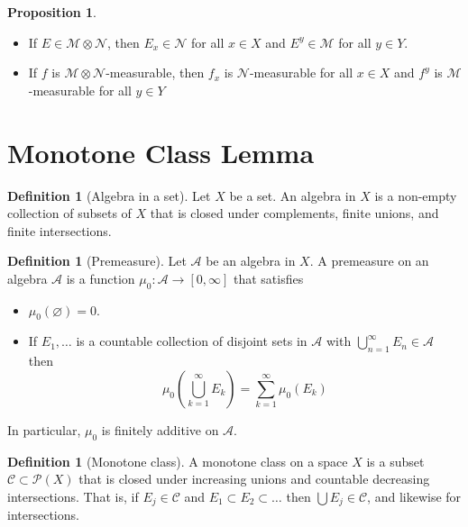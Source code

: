 \documentclass{article}
\theoremstyle{definition}
\newtheorem{prop}{Proposition}[section]
\newcommand{\lp}{\left(}
\newcommand{\rp}{\right)}
\theoremstyle{theorem}
\newtheorem{definition}[theorem]{Definition}
\begin{document}
\begin{prop}
$\,$
\begin{itemize}
    \item If $E \in \mathcal{M}\otimes \mathcal{N}$, then $E_x \in \mathcal{N}$ for all $x\in X$ and $E^y \in \mathcal{M}$ for all $y\in Y$. 
    
    \item If $f$ is $\mathcal{M}\otimes \mathcal{N}$-measurable, then $f_x$ is $\mathcal{N}$-measurable for all $x\in X$ and $f^y$ is $\mathcal{M}$-measurable for all $y\in Y$
\end{itemize}
\end{prop}




\section{Monotone Class Lemma}



\begin{definition}[Algebra in a set]
Let $X$ be a set. An algebra in $X$ is a non-empty collection of subsets of $X$ that is closed under complements, finite unions, and finite intersections. 
\end{definition}

\begin{definition}[Premeasure]
Let $\mathcal{A}$ be an algebra in $X$. A premeasure on an algebra $\mathcal{A}$ is a function $\mu_0 : \mathcal{A} \to [0,\infty]$ that satisfies 
\begin{itemize}
    \item $\mu_0(\varnothing) = 0.$
    
    \item If $E_1,\dots$ is a countable collection of disjoint sets in $\mathcal{A}$ with $\bigcup^\infty_{n=1}E_n \in \mathcal{A}$ then 
    \begin{equation*}
        \mu_0 \lp \bigcup^\infty_{k=1} E_k \rp = \sum^\infty_{k=1} \mu_0 (E_k)
    \end{equation*}
\end{itemize}
In particular, $\mu_0$ is finitely additive on $\mathcal{A}$. 
\end{definition}





\begin{definition}[Monotone class]
A monotone class on a space $X$ is a subset $\mathcal{C}\subset \mathcal{P}(X)$ that is closed under increasing unions and countable decreasing intersections. That is, if $E_j \in \mathcal{C}$ and $E_1 \subset E_2 \subset \dots$ then $\bigcup E_j \in \mathcal{C}$, and likewise for intersections.
\end{definition}
\end{document}
